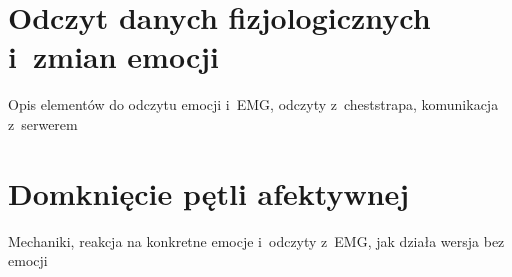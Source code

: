 \section{Odczyt danych fizjologicznych i~zmian emocji}
Opis elementów do odczytu emocji i~EMG, odczyty z~cheststrapa, komunikacja z~serwerem

\section{Domknięcie pętli afektywnej}
Mechaniki, reakcja na konkretne emocje i~odczyty z~EMG, jak działa wersja bez emocji